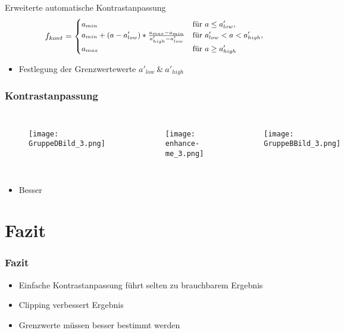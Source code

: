 \documentclass[14pt]{beamer}
\begin{document}
\begin{frame}
	\begin{block}{Erweiterte automatische Kontrastanpassung}	
		\begin{equation*}
		\small{
			f_{kont}=
			\begin{cases}
			a_{min}   			& \text{für } a \leq a'_{low}, \\
			a_{min} + (a-a'_{low})*\frac{a_{max}-a_{min}}{a'_{high}-a'_{low}}	& \text{für } a'_{low} < a < a'_{high}, \\
			a_{max}        		& \text{für } a \geq a'_{high}
			\end{cases}
		}
		\end{equation*}
	\end{block}
	\begin{itemize}
		\item Festlegung der Grenzwertewerte $a'_{low}\ \&\ a'_{high}$
	\end{itemize}

\end{frame}

\begin{frame}
	\frametitle{Kontrastanpassung}
	\begin{columns}[c]
		\begin{figure}
			\texttt{[image: GruppeDBild\_3.png]}
		\end{figure}
		\begin{figure}
			\texttt{[image: enhance-me\_3.png]}
		\end{figure}
		\begin{figure}
			\texttt{[image: GruppeBBild\_3.png]}
		\end{figure}		 	
	\end{columns}	
	\begin{itemize}
		\item Besser
	\end{itemize}
\end{frame}

\section{Fazit}

\begin{frame}
	\frametitle{Fazit}
	\begin{itemize}
		\item Einfache Kontrastanpassung führt selten zu brauchbarem Ergebnis
		\item Clipping verbessert Ergebnis
		\item Grenzwerte müssen besser bestimmt werden		
	\end{itemize}
\end{frame}
\end{document}
